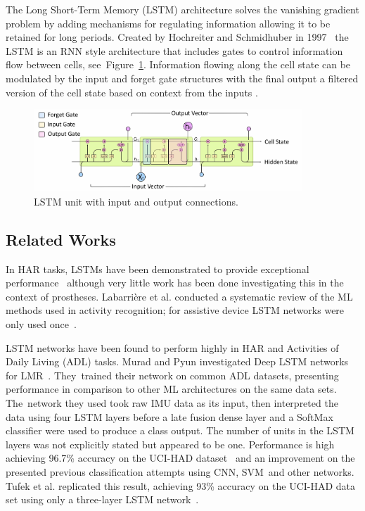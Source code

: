 The Long Short-Term Memory (LSTM) architecture solves the vanishing gradient problem by adding mechanisms for regulating information allowing it to be retained for long periods. Created by Hochreiter and Schmidhuber in 1997~\cite{Hochreiter1997} the LSTM is an RNN style architecture that includes gates to control information flow between cells, see~\mbox{Figure~\ref{fig:lstm_unit}.} Information flowing along the cell state can be modulated by the input and forget gate structures with the final output a filtered version of the cell state based on context from the inputs \cite{Olah2015}.

\begin{figure}[!hbt]
    \centering
    \includegraphics[width=0.9\textwidth]{content/4-LSTM_Behaviour/lstm/lstm_internal_operation.jpg}
    \caption{LSTM unit with input and output connections.}
    \label{fig:lstm_unit}
\end{figure}

\subsection{Related Works}
\label{sec:related_work}
In HAR tasks, LSTMs have been demonstrated to provide exceptional performance~\cite{Murad2017} although very little work has been done investigating this in the context of prostheses. Labarri\`ere et al. conducted a systematic review of the ML methods used in activity recognition; for assistive device LSTM networks were only used once~\cite{Labarriere2020}.

LSTM networks have been found to perform highly in HAR and Activities of Daily Living (ADL) tasks. Murad and Pyun investigated Deep LSTM networks for LMR~\cite{Murad2017}. They~trained their network on common ADL datasets, presenting performance in comparison to other ML architectures on the same data sets. The~network they used took raw IMU data as its input, then interpreted the data using four LSTM layers before a late fusion dense layer and a SoftMax classifier were used to produce a class output. The number of units in the LSTM layers was not explicitly stated but appeared to be one. Performance is high achieving 96.7\% accuracy on the UCI-HAD dataset~\cite{Anguita2013} and an improvement on the presented previous classification attempts using CNN, SVM~and other networks. Tufek et al. replicated this result, achieving 93\% accuracy on the UCI-HAD data set using only a three-layer LSTM network~\cite{Tufek2020}.

